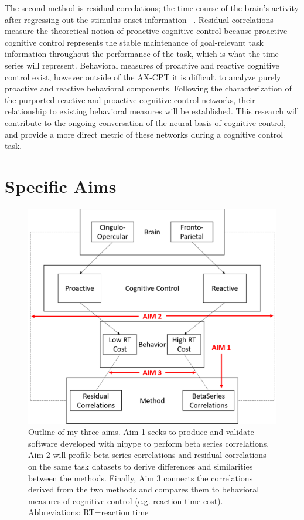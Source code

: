\documentclass[phd,appendix,figures]{uithesis}
\begin{document}
The second method is residual correlations; the time-course of the brain's activity after regressing out the stimulus onset information ~\citep{Fair2007,Cole2014,Bolt2017}. 
Residual correlations measure the theoretical notion of proactive cognitive control because proactive cognitive control represents the stable maintenance of goal-relevant task information throughout the performance of the task, which is what the time-series will represent.
Behavioral measures of proactive and reactive cognitive control exist, however outside of the AX-CPT it is difficult to analyze purely proactive and reactive behavioral components. 
Following the characterization of the purported reactive and proactive cognitive control networks, their relationship to existing behavioral measures will be established.
This research will contribute to the ongoing conversation of the neural basis of cognitive control, and provide a more direct metric of these networks during a  cognitive control task.

\section{Specific Aims}
\begin{figure}[H]%
	\centering
	\includegraphics[width=1\linewidth]{all_aims}
	\caption{Outline of my three aims. Aim 1 seeks to produce and validate software developed with nipype to perform beta series correlations. Aim 2 will profile beta series correlations and residual correlations on the same task datasets to derive differences and similarities between the methods. Finally, Aim 3 connects the correlations derived from the two methods and compares them to behavioral measures of cognitive control (e.g. reaction time cost). Abbreviations: RT=reaction time}
	\label{fig:all_aims}
\end{figure}
\end{document}
